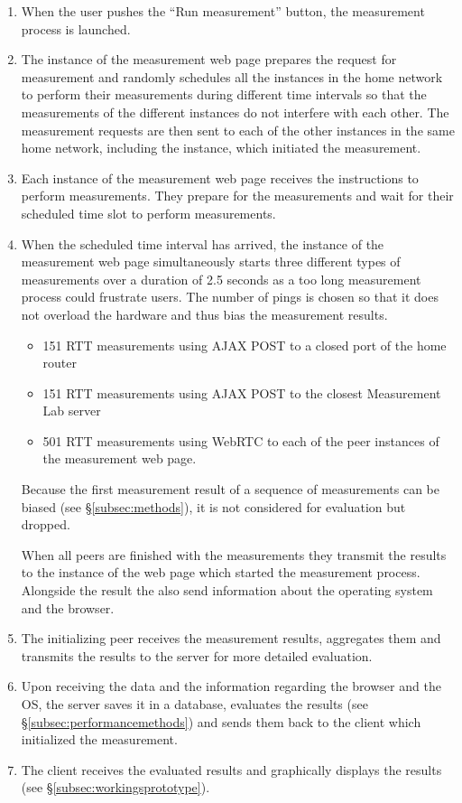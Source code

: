 \documentclass{sig-alternate-10pt}
\begin{document}
\begin{enumerate}
\item When the user pushes the ``Run measurement'' button, the measurement process is launched. 
\item The instance of the measurement web page prepares the request for measurement and randomly schedules all the instances in the home network to perform their measurements during different time intervals so that the measurements of the different instances do not interfere with each other. The measurement requests are then sent to each of the other instances in the same home network, including the instance, which initiated the measurement. 
\item Each instance of the measurement web page receives the instructions to perform measurements. They prepare for the measurements and wait for their scheduled time slot to perform measurements. 
\item When the scheduled time interval has arrived, the instance of the measurement web page simultaneously starts three different types of measurements over a duration of 2.5 seconds as a too long measurement process could frustrate users. The number of pings is chosen so that it does not overload the hardware and thus bias the measurement results.

\begin{itemize}
\item 151 RTT measurements using AJAX POST to a closed port of the home router
\item 151 RTT measurements using AJAX POST to the closest Measurement Lab server \cite{_measurement_????}
\item 501 RTT measurements using WebRTC to each of the peer instances of the measurement web page. 
\end{itemize}
Because the first measurement result of a sequence of measurements can be biased (see \S\ref{subsec:methods}), it is not considered for evaluation but dropped. 

When all peers are finished with the measurements they transmit the results to the instance of the web page which started the measurement process. Alongside the result the also send information about the operating system and the browser. 
\item The initializing peer receives the measurement results, aggregates them and transmits the results to the server for more detailed evaluation. 
\item Upon receiving the data and the information regarding the browser and the OS, the server saves it in a database, evaluates the results (see \S\ref{subsec:performancemethods}) and sends them back to the client which initialized the measurement. 
\item The client receives the evaluated results and graphically displays the results (see \S\ref{subsec:workingsprototype}).
\end{enumerate}
\end{document}
